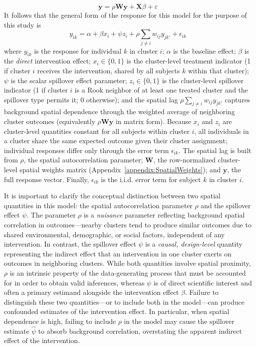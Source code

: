 \documentclass{article}[11pt]
\begin{document}
\begin{equation}
    \mathbf{y} = \rho\mathbf{Wy}+\mathbf{X}\beta + \varepsilon
\end{equation}
It follows that the general form of the response for this model for the purpose of this study is
\begin{equation}
    y_{ik} = \alpha + \beta x_i + \psi z_i + \rho\sum_{j \neq i} w_{ij} y_{jk'} + \epsilon_{ik}
\end{equation}
where $y_{ik}$ is the response for individual $k$ in cluster $i$; $\alpha$ is the baseline effect; $\beta$ is the \textit{direct} intervention effect; $x_i \in \{0,1\}$ is the cluster-level treatment indicator (1 if cluster $i$ receives the intervention, shared by all subjects $k$ within that cluster); $\psi$ is the scalar spillover effect parameter; $z_i \in \{0,1\}$ is the cluster-level spillover indicator (1 if cluster $i$ is a Rook neighbor of at least one treated cluster and the spillover type permits it; 0 otherwise); and the spatial lag $\rho\sum_{j \neq i} w_{ij} y_{jk'}$ captures background spatial dependence through the weighted average of neighboring cluster outcomes (equivalently $\rho\mathbf{Wy}$ in matrix form). Because $x_i$ and $z_i$ are cluster-level quantities constant for all subjects within cluster $i$, all individuals in a cluster share the same expected outcome given their cluster assignment; individual responses differ only through the error term $\epsilon_{ik}$. The spatial lag is built from $\rho$, the spatial autocorrelation parameter; $\mathbf{W}$, the row-normalized cluster-level spatial weights matrix (Appendix~\ref{appendix:SpatialWeights}); and $\mathbf{y}$, the full response vector. Finally, $\epsilon_{ik}$ is the i.i.d. error term for subject $k$ in cluster $i$.

It is important to clarify the conceptual distinction between two spatial quantities in this model: the spatial autocorrelation parameter $\rho$ and the spillover effect $\psi$. The parameter $\rho$ is a \emph{nuisance} parameter reflecting background spatial correlation in outcomes---nearby clusters tend to produce similar outcomes due to shared environmental, demographic, or social factors, independent of any intervention. In contrast, the spillover effect $\psi$ is a \emph{causal, design-level} quantity representing the indirect effect that an intervention in one cluster exerts on outcomes in neighboring clusters. While both quantities involve spatial proximity, $\rho$ is an intrinsic property of the data-generating process that must be accounted for in order to obtain valid inferences, whereas $\psi$ is of direct scientific interest and often a primary estimand alongside the intervention effect $\beta$. Failure to distinguish these two quantities---or to include both in the model---can produce confounded estimates of the intervention effect. In particular, when spatial dependence is high, failing to include $\rho$ in the model may cause the spillover estimate $\hat{\psi}$ to absorb background correlation, overstating the apparent indirect effect of the intervention.
\end{document}
